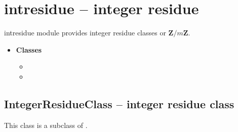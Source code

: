 

 \section{intresidue -- integer residue}
intresidue module provides integer residue classes or $\mathbf{Z}/m\mathbf{Z}$.

 \begin{itemize}
   \item {\bf Classes}
   \begin{itemize}
     \item {}
     \item {}
   \end{itemize}
 \end{itemize}

\C

 \subsection{IntegerResidueClass -- integer residue class}
 
 This class is a subclass of .

